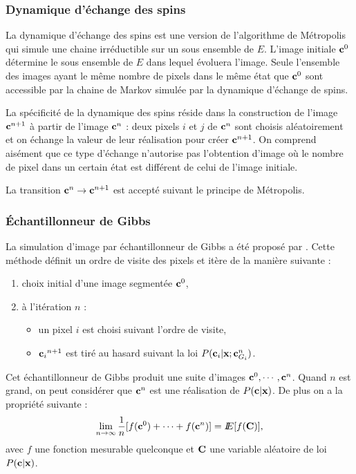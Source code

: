 \subsubsection{Dynamique d'\'echange des spins}
La dynamique d'\'echange des spins\cite{Cross1983} est une version 
de l'algorithme de M\'etropolis qui simule une chaine irr\'eductible
sur un sous ensemble de $E$. L'image initiale $\mbox{\bf c}^0$ d\'etermine
le sous ensemble de $E$ dans lequel \'evoluera l'image. Seule 
l'ensemble des images ayant le m\^eme nombre de pixels dans le m\^eme
\'etat  que $\mbox{\bf c}^0$ sont accessible par la chaine de Markov simul\'ee
par la dynamique d'\'echange de spins. 

La sp\'ecificit\'e de la dynamique des spins r\'eside dans la
construction de l'image $\mbox{\bf c}^{n+1}$ \`a partir de l'image $\mbox{\bf c}^n$ :
deux pixels $i$ et $j$ de $\mbox{\bf c}^n$ sont choisis al\'eatoirement et
on \'echange la valeur de leur r\'ealisation pour cr\'eer $\mbox{\bf c}^{n+1}$.
On comprend ais\'ement que ce type d'\'echange n'autorise pas l'obtention
d'image o\`u le nombre de pixel dans un certain \'etat est diff\'erent
de celui de l'image initiale.

La transition $\mbox{\bf c}^n \rightarrow \mbox{\bf c}^{n+1}$ est accept\'e suivant 
le principe de M\'etropolis.

\subsubsection{\'Echantillonneur de Gibbs}
La simulation d'image par \'echantillonneur de Gibbs a \'et\'e propos\'e 
par . Cette m\'ethode d\'efinit un ordre
de visite des pixels et it\`ere de la mani\`ere suivante : 
\begin{enumerate}
\item choix initial d'une image segment\'ee $\mbox{\bf c}^0$,
\item \`a l'it\'eration $n$ : 
\begin{itemize}
\item 
un pixel $i$ est choisi suivant l'ordre de visite,
\item 
${\mbox{\bf c}_i}^{n+1}$ est tir\'e au hasard suivant la loi $P(\mbox{\bf c}_i | \mbox{\bf x}; \mbox{\bf c}_{G_i}^{n})$.
\end{itemize}
\end{enumerate} 
Cet \'echantillonneur de Gibbs produit une suite d'images $\mbox{\bf c}^0,\cdots,\mbox{\bf c}^n$. Quand
$n$ est grand, on peut consid\'erer que $\mbox{\bf c}^n$ est une r\'ealisation de
$P(\mbox{\bf c} | \mbox{\bf x})$. De plus on a la propri\'et\'e suivante :
$$
\lim_{n \rightarrow \infty}\frac{1}{n} [ f(\mbox{\bf c}^0)+ \cdots +f(\mbox{\bf c}^n)]=I\!\!E[f(\mbox{\bf C})],
$$
avec $f$ une fonction mesurable quelconque et $\mbox{\bf C}$ une variable al\'eatoire de loi $P(\mbox{\bf c} | \mbox{\bf x})$.


